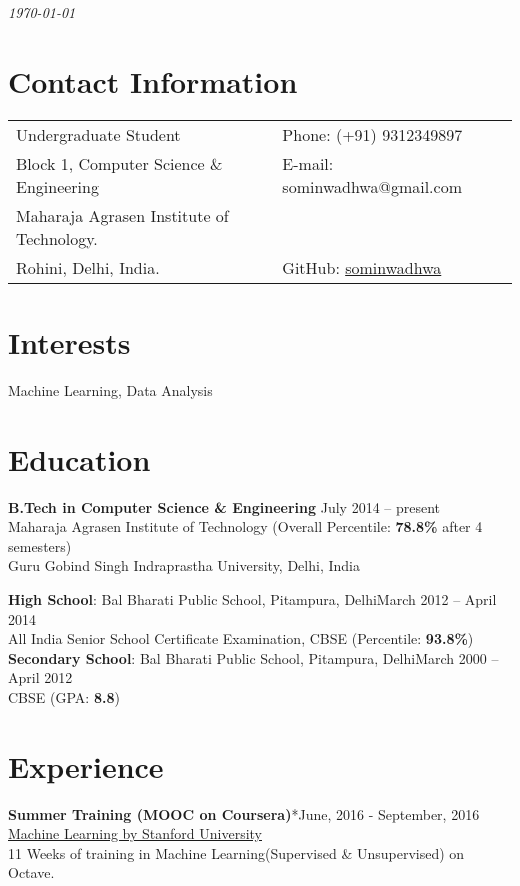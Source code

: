 \documentclass[margin,line]{res}
\begin{document}
 \hfill {\em \today}

\begin{resume}
\section{\sc Contact Information}

\vspace{.05in}
\begin{tabular}{@{}p{3.5in}p{3in}}
Undergraduate Student             & {Phone:}  (+91) 9312349897 \\
Block 1, Computer Science \& Engineering 
 & {E-mail:}  sominwadhwa@gmail.com\\
Maharaja Agrasen Institute of Technology.\\
Rohini, Delhi, India.  & {GitHub:} {\href{https://github.com/sominwadhwa}{\color{blue} sominwadhwa}}
\end{tabular}


\section{\sc Interests}

Machine Learning, Data Analysis

\section{\sc Education}
{\bf B.Tech in Computer Science \& Engineering} \hfill July 2014 -- present\\
Maharaja Agrasen Institute of Technology \hfill(Overall Percentile: {\bf78.8\%} after 4 semesters)\\
Guru Gobind Singh Indraprastha University, Delhi, India

{\bf High School}: Bal Bharati Public School, Pitampura, Delhi\hfill March 2012 -- April 2014\\
All India Senior School Certificate Examination, CBSE \hfill(Percentile: {\bf 93.8\%})\\
{\bf Secondary School}: Bal Bharati Public School, Pitampura, Delhi\hfill March 2000 -- April 2012\\
CBSE \hfill(GPA: {\bf 8.8})

\section{\sc Experience}
{\bf Summer Training (MOOC on Coursera)}*\hfill June, 2016 - September, 2016\\ \href{https://www.coursera.org/learn/machine-learning/home/welcome}{Machine Learning by Stanford University}\\  
11 Weeks of training in Machine Learning(Supervised \& Unsupervised) on Octave.


\end{resume}
\end{document}
